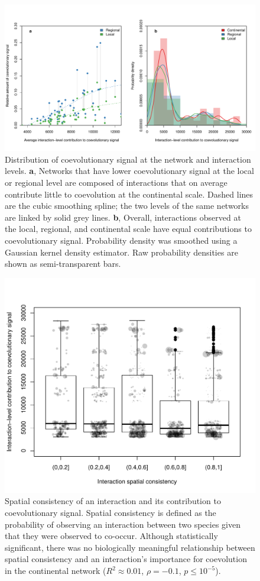 \documentclass{nature}
\begin{document}
\begin{figure}
\centering
\includegraphics{../figures/figure4.pdf}
\caption{Distribution of coevolutionary signal at the network and
interaction levels. \textbf{a}, Networks that have lower coevolutionary
signal at the local or regional level are composed of interactions that
on average contribute little to coevolution at the continental scale.
Dashed lines are the cubic smoothing spline; the two levels of the same
networks are linked by solid grey lines. \textbf{b}, Overall,
interactions observed at the local, regional, and continental scale have
equal contributions to coevolutionary signal. Probability density was
smoothed using a Gaussian kernel density estimator. Raw probability
densities are shown as semi-transparent bars.}
\end{figure}

\begin{figure}
\centering
\includegraphics{../figures/figure3.pdf}
\caption{Spatial consistency of an interaction and its contribution to
coevolutionary signal. Spatial consistency is defined as the probability
of observing an interaction between two species given that they were
observed to co-occur. Although statistically significant, there was no
biologically meaningful relationship between spatial consistency and an
interaction's importance for coevolution in the continental network
($R^2 \approx 0.01$, $\rho = -0.1$, $p \leq 10^{-5}$).}
\end{figure}
\end{document}
